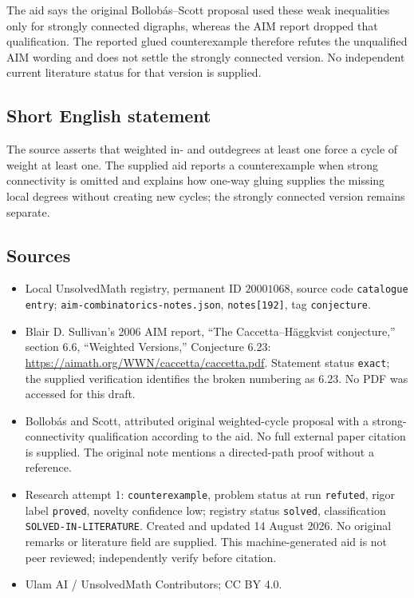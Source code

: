 \documentclass[11pt]{article}
\begin{document}
The aid says the original Bollob\'as--Scott proposal used these weak inequalities only for strongly connected digraphs, whereas the AIM report dropped that qualification. The reported glued counterexample therefore refutes the unqualified AIM wording and does not settle the strongly connected version. No independent current literature status for that version is supplied.
\subsection{Short English statement}
The source asserts that weighted in- and outdegrees at least one force a cycle of weight at least one. The supplied aid reports a counterexample when strong connectivity is omitted and explains how one-way gluing supplies the missing local degrees without creating new cycles; the strongly connected version remains separate.
\subsection{Sources}
\begin{itemize}
\item Local UnsolvedMath registry, permanent ID \(20001068\), source code \texttt{catalogue entry}; \texttt{aim-combinatorics-notes.json}, \texttt{notes[192]}, tag \texttt{conjecture}.
\item Blair D. Sullivan's 2006 AIM report, ``The Caccetta--H\"aggkvist conjecture,'' section 6.6, ``Weighted Versions,'' Conjecture 6.23: \url{https://aimath.org/WWN/caccetta/caccetta.pdf}. Statement status \texttt{exact}; the supplied verification identifies the broken numbering as 6.23. No PDF was accessed for this draft.
\item Bollob\'as and Scott, attributed original weighted-cycle proposal with a strong-connectivity qualification according to the aid. No full external paper citation is supplied. The original note mentions a directed-path proof without a reference.
\item Research attempt 1: \texttt{counterexample}, problem status at run \texttt{refuted}, rigor label \texttt{proved}, novelty confidence low; registry status \texttt{solved}, classification \texttt{SOLVED-IN-LITERATURE}. Created and updated 14 August 2026. No original remarks or literature field are supplied. This machine-generated aid is not peer reviewed; independently verify before citation.
\item Ulam AI / UnsolvedMath Contributors; CC BY 4.0.
\end{itemize}
\end{document}

